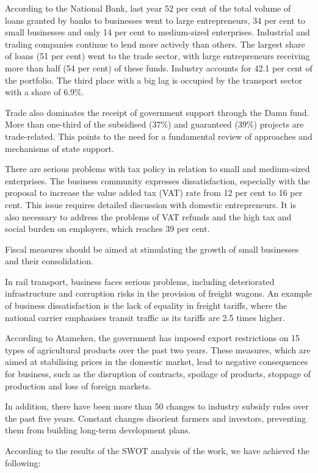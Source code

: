 \begin{multicols}{2}
According to the National Bank, last year 52 per cent of the total
volume of loans granted by banks to businesses went to large
entrepreneurs, 34 per cent to small businesses and only 14 per cent to
medium-sized enterprises. Industrial and trading companies continue to
lend more actively than others. The largest share of loans (51 per cent)
went to the trade sector, with large entrepreneurs receiving more than
half (54 per cent) of these funds. Industry accounts for 42.1 per cent
of the portfolio. The third place with a big lag is occupied by the
transport sector with a share of 6.9\%.

Trade also dominates the receipt of government support through the Damu
fund. More than one-third of the subsidised (37\%) and guaranteed (39\%)
projects are trade-related. This points to the need for a fundamental
review of approaches and mechanisms of state support.

There are serious problems with tax policy in relation to small and
medium-sized enterprises. The business community expresses
dissatisfaction, especially with the proposal to increase the value
added tax (VAT) rate from 12 per cent to 16 per cent. This issue
requires detailed discussion with domestic entrepreneurs. It is also
necessary to address the problems of VAT refunds and the high tax and
social burden on employers, which reaches 39 per cent.

Fiscal measures should be aimed at stimulating the growth of small
businesses and their consolidation.

In rail transport, business faces serious problems, including
deteriorated infrastructure and corruption risks in the provision of
freight wagons. An example of business dissatisfaction is the lack of
equality in freight tariffs, where the national carrier emphasises
transit traffic as its tariffs are 2.5 times higher.

According to Atameken, the government has imposed export restrictions on
15 types of agricultural products over the past two years. These
measures, which are aimed at stabilising prices in the domestic market,
lead to negative consequences for business, such as the disruption of
contracts, spoilage of products, stoppage of production and loss of
foreign markets.

In addition, there have been more than 50 changes to industry subsidy
rules over the past five years. Constant changes disorient farmers and
investors, preventing them from building long-term development plans.

According to the results of the SWOT analysis of the work, we have
achieved the following:
\end{multicols}


